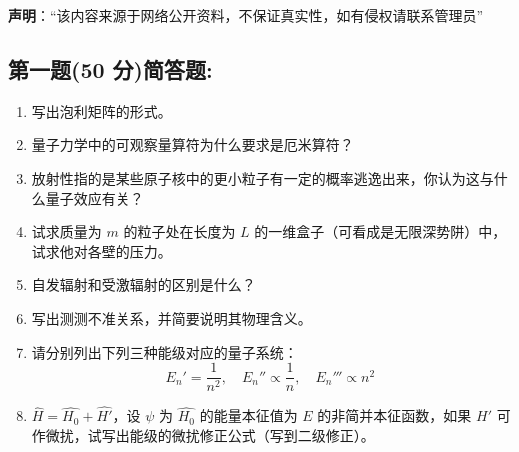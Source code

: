 
\textbf{声明}：“该内容来源于网络公开资料，不保证真实性，如有侵权请联系管理员”

\subsection{第一题(50 分)简答题:}
\begin{enumerate}
  \item 写出泡利矩阵的形式。
  \item 量子力学中的可观察量算符为什么要求是厄米算符？
  \item 放射性指的是某些原子核中的更小粒子有一定的概率逃逸出来，你认为这与什么量子效应有关？
  \item 试求质量为 $m$ 的粒子处在长度为 $L$ 的一维盒子（可看成是无限深势阱）中，试求他对各壁的压力。
  \item 自发辐射和受激辐射的区别是什么？
  \item 写出测测不准关系，并简要说明其物理含义。
  \item 请分别列出下列三种能级对应的量子系统：
  \[    E_n' = \frac{1}{n^2}, \quad E_n'' \propto \frac{1}{n}, \quad E_n''' \propto n^2 ~\]
  \item $\hat{H} = \hat{H_0} + \hat{H'}$，设 $\psi$ 为 $\hat{H_0}$ 的能量本征值为 $E$ 的非简并本征函数，如果 $\hat{H'}$ 可作微扰，试写出能级的微扰修正公式（写到二级修正）。
\end{enumerate}